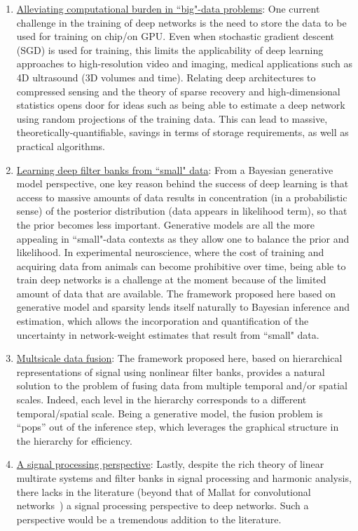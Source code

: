 \documentclass[12pt]{article}
\begin{document}
\begin{enumerate}
	\item \underline{Alleviating computational burden in ``big"-data problems}: One current challenge in the training of deep networks is the need to store the data to be used for training on chip/on GPU. Even when stochastic gradient descent (SGD) is used for training, this limits the applicability of deep learning approaches to high-resolution video and imaging, medical applications such as 4D ultrasound (3D volumes and time). Relating deep architectures to compressed sensing and the theory of sparse recovery and high-dimensional statistics opens door for ideas such as being able to estimate a deep network using random projections of the training data. This can lead to massive, theoretically-quantifiable, savings in terms of storage requirements, as well as practical algorithms.

	\item \underline{Learning deep filter banks from ``small" data}:  From a Bayesian generative model perspective, one key reason behind the success of deep learning is that access to massive amounts of data results in concentration (in a probabilistic sense) of the posterior distribution  (data appears in likelihood term), so that the prior becomes less important. Generative models are all the more appealing in ``small"-data contexts as they allow one to balance the prior and likelihood. In experimental neuroscience, where the cost of training and acquiring data from animals can become prohibitive over time, being able to train deep networks is a challenge at the moment because of the limited amount of data that are available. The framework proposed here based on generative model and sparsity lends itself naturally to Bayesian inference and estimation, which allows the incorporation and quantification of the uncertainty in network-weight estimates that result from ``small" data.
	
	\item \underline{Multsicale data fusion}: The framework proposed here, based on hierarchical representations of signal using nonlinear filter banks, provides a natural solution to the problem of fusing data from multiple temporal and/or spatial scales. Indeed, each level in the hierarchy corresponds to a different temporal/spatial scale. Being a generative model, the fusion problem is ``pops'' out of the inference step, which leverages the graphical structure in the hierarchy for efficiency.
	
	\item \underline{A signal processing perspective}: Lastly, despite the rich theory of linear multirate systems and filter banks in signal processing and harmonic analysis, there lacks in the literature (beyond that of Mallat for convolutional networks~\cite{bruna2013invariant}) a signal processing perspective to deep networks. Such a perspective would be a tremendous addition to the literature.
	
\end{enumerate}
\end{document}
